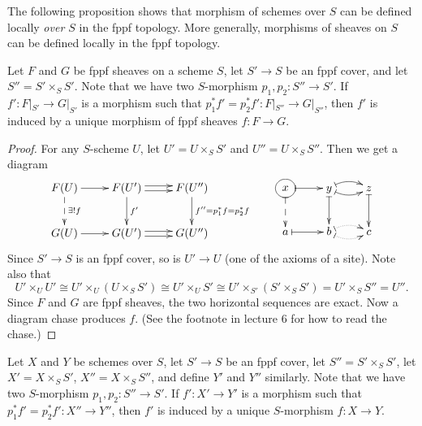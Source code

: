  The following proposition shows that
 morphism of schemes over $S$ can be defined locally \emph{over $S$} in the fppf
 topology. More generally, morphisms of sheaves on $S$ can be defined locally in the fppf
 topology.
 \begin{proposition}
 \label{lec07P:morphisms_fppf_glue}
   Let $F$ and $G$ be fppf sheaves on a scheme $S$, let $S'\to S$ be an fppf cover, and
   let $S''=S'\times_S S'$. Note that we have two $S$-morphism $p_1,p_2:S''\to S'$. If
   $f':F|_{S'}\to G|_{S'}$ is a morphism such that $p_1^*f'=p_2^*f':F|_{S''}\to G|_{S''}$,
   then $f'$ is induced by a unique morphism of fppf sheaves $f:F\to G$.
 \end{proposition}
 \begin{proof}
   For any $S$-scheme $U$, let $U'=U\times_S S'$ and $U''=U\times_S S''$. Then we get a
   diagram
   \[\xymatrix{
    F(U)\ar[r] \ar@{-->}[d]^{\exists ! f} & F(U')\ar@<.5ex>[r]\ar@<-.5ex>[r] \ar[d]^{f'} & F(U'') \ar[d]^{f''=p_1^*f=p_2^*f}\\
    G(U)\ar[r] & G(U')\ar@<.5ex>[r]\ar@<-.5ex>[r] & G(U'')
   }\qquad
   \xymatrix{
    *++[o][F-]{x} \ar@{|-->}[d] \ar@{|->}[r] & y \ar@/^/@{|->}[r]\ar@/_/@{|->}[r] \ar@{|->}[d] & z \ar@{|->}[d] \\
    a \ar@{|->}[r] & b \ar@/^/@{|.>}[r]\ar@/_/@{|.>}[r] & c
   }\]
    Since $S'\to S$ is an fppf cover, so is $U'\to U$ (one of the axioms of a site). Note
   also that
   \[
   U'\times_U U' \cong U'\times_U (U\times_S S')\cong U'\times_U S'
   \cong U'\times_{S'}(S'\times_S S')= U'\times_S S'' = U''.
   \]
   Since $F$ and $G$ are fppf sheaves, the two horizontal sequences are exact. Now a
   diagram chase produces $f$. (See the footnote in lecture 6 for how to read the chase.)
 \end{proof}
 \begin{corollary} \label{lec07C:morphisms_fppf_glue}
   Let $X$ and $Y$ be schemes over $S$, let $S'\to S$ be an fppf cover, let
   $S''=S'\times_S S'$, let $X'=X\times_S S'$, $X''=X\times_S S''$, and define $Y'$ and
   $Y''$ similarly. Note that we have two $S$-morphism $p_1,p_2:S''\to S'$. If $f':X'\to
   Y'$ is a morphism such that $p_1^*f'=p_2^*f':X''\to Y''$, then $f'$ is induced
   by a unique $S$-morphism $f:X\to Y$.
 \end{corollary}
